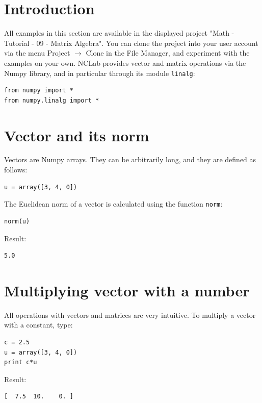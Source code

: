 \documentclass{article}
\begin{document}
\normalsize

\newpage
\setcounter{tocdepth}{2}
\tableofcontents

\newpage

\pagestyle{plain}
\setcounter{page}{1}


\newpage

\pagestyle{plain}


\section{Introduction}

All examples in this section are available in the displayed project 
"Math - Tutorial - 09 - Matrix Algebra". You can clone the project into 
your user account via the menu Project $\rightarrow$ Clone in the File 
Manager, and experiment with the examples on your own.
NCLab provides vector and matrix operations via the Numpy library,
and in particular through its module {\tt linalg}:

\begin{verbatim}
from numpy import *
from numpy.linalg import *
\end{verbatim}

\section{Vector and its norm}

Vectors are Numpy arrays. They can be arbitrarily long, and they
are defined as follows: 
\begin{verbatim}
u = array([3, 4, 0])
\end{verbatim}
The Euclidean norm of a vector is calculated using the function {\tt norm}:
\begin{verbatim}
norm(u)
\end{verbatim}
Result:
\begin{verbatim}
5.0
\end{verbatim}

\section{Multiplying vector with a number}

All operations with vectors and matrices are very intuitive. To multiply 
a vector with a constant, type:

\begin{verbatim}
c = 2.5
u = array([3, 4, 0])
print c*u
\end{verbatim}
Result:
\begin{verbatim}
[  7.5  10.    0. ]
\end{verbatim}
\end{document}
